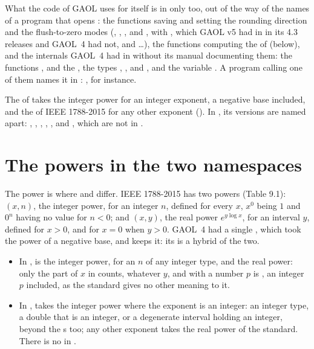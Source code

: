 \documentclass[12pt,a4paper,twoside,openright]{book}
\begin{document}
\noindent
What the code of GAOL uses for itself is in  only too, out of
the way of the names of a program that opens : the functions saving
and setting the rounding direction and the flush-to-zero modes
(, , , and
, with ,
which GAOL v5 had in  in its 4.3 releases and GAOL~4 had not, and
\ldots), the functions computing the  of
 (below), and the internals GAOL~4 had in  without its
manual documenting them: the functions ,
 and the , the types
, ,  and
, and the variable . A program calling one
of them names it in : ,
for instance.

\medskip
The  of  takes the integer power for an integer exponent,
a negative base included, and the  of IEEE 1788-2015 for any other
exponent (). In , its versions are named
apart: , , ,
, , 
and , which are not in .

\section{The powers in the two namespaces}\label{sec:pow-namespaces}
%

The power is where  and  differ.\newinvfive{}
IEEE 1788-2015 has two powers (Table 9.1): $(x,n)$, the integer
power, for an integer $n$, defined for every $x$, $x^0$ being $1$ and $0^n$
having no value for $n<0$; and $(x,y)$, the real power
$e^{y\log x}$, for an interval $y$, defined for $x>0$, and for $x=0$ when
$y>0$. GAOL~4 had a single , which took the power of a negative
base, and  keeps it: its  is a hybrid of the two.

\begin{itemize}
\item In ,  is the integer power, for an
  $n$ of any integer type, and  the real power: only the part
  of $x$ in  counts, whatever $y$, and  with a
  number $p$ is , an integer $p$ included, as the standard
  gives no other meaning to it.
\item In ,  takes the integer power where the
  exponent is an integer: an integer type, a double that is an integer, or a
  degenerate interval  holding an integer, beyond the s
  too; any other exponent takes the real power of the standard. There is no
   in .
\end{itemize}
\end{document}

